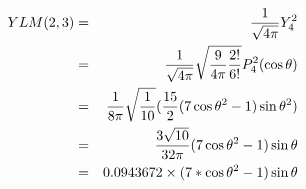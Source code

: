 \begin{eqnarray}
YLM(2,3)&=&{1 \over \sqrt{4 \pi}} Y_4^2\nonumber\\
        &=&{1 \over \sqrt{4 \pi}}
          \sqrt{{9 \over 4 \pi} {2! \over 6!}}
          P_4^2(\cos\theta)\nonumber\\
        &=&{1 \over 8 \pi} \sqrt{1 \over 10}
           ({15 \over 2} (7\cos\theta^2-1) \sin\theta^2)\nonumber\\
        &=&{3 \sqrt{10} \over 32 \pi} (7 \cos\theta^2 - 1) \sin\theta\nonumber\\
        &=&0.0943672 \times (7 * \cos\theta^2 -1) \sin\theta\nonumber\\
\end{eqnarray}


